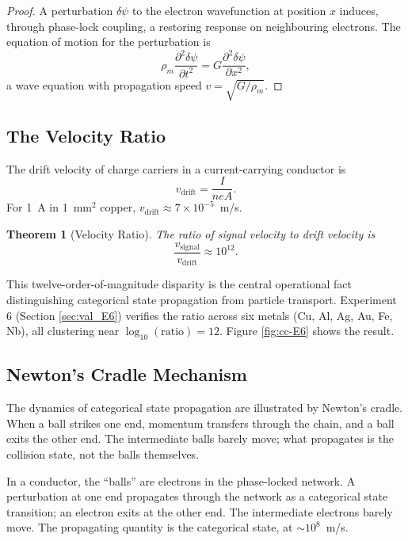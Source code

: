 \documentclass[twocolumn,10pt,a4paper]{article}
\newtheorem{theorem}{Theorem}[section]
\theoremstyle{definition}
\theoremstyle{remark}
\begin{document}
\begin{proof}
A perturbation $\delta\psi$ to the electron wavefunction at position $x$ induces, through phase-lock coupling, a restoring response on neighbouring electrons. The equation of motion for the perturbation is
\[
\rho_m \frac{\partial^2 \delta\psi}{\partial t^2} = G \frac{\partial^2 \delta\psi}{\partial x^2},
\]
a wave equation with propagation speed $v = \sqrt{G/\rho_m}$.
\end{proof}

\subsection{The Velocity Ratio}

The drift velocity of charge carriers in a current-carrying conductor is \citep{drude1900a}
\begin{equation}
v_{\mathrm{drift}} = \frac{I}{neA}.
\label{eq:drift_velocity}
\end{equation}
For 1~A in 1~mm$^2$ copper, $v_{\mathrm{drift}} \approx 7\times10^{-5}$~m/s.

\begin{theorem}[Velocity Ratio]
\label{thm:velocity_ratio}
The ratio of signal velocity to drift velocity is
\begin{equation}
\frac{v_{\mathrm{signal}}}{v_{\mathrm{drift}}} \approx 10^{12}.
\label{eq:velocity_ratio}
\end{equation}
\end{theorem}

This twelve-order-of-magnitude disparity is the central operational fact distinguishing categorical state propagation from particle transport. Experiment 6 (Section \ref{sec:val_E6}) verifies the ratio across six metals (Cu, Al, Ag, Au, Fe, Nb), all clustering near $\log_{10}(\mathrm{ratio}) = 12$. Figure \ref{fig:cc-E6} shows the result.

\subsection{Newton's Cradle Mechanism}

The dynamics of categorical state propagation are illustrated by Newton's cradle. When a ball strikes one end, momentum transfers through the chain, and a ball exits the other end. The intermediate balls barely move; what propagates is the collision state, not the balls themselves.

In a conductor, the ``balls'' are electrons in the phase-locked network. A perturbation at one end propagates through the network as a categorical state transition; an electron exits at the other end. The intermediate electrons barely move. The propagating quantity is the categorical state, at $\sim 10^8$~m/s.
\end{document}
